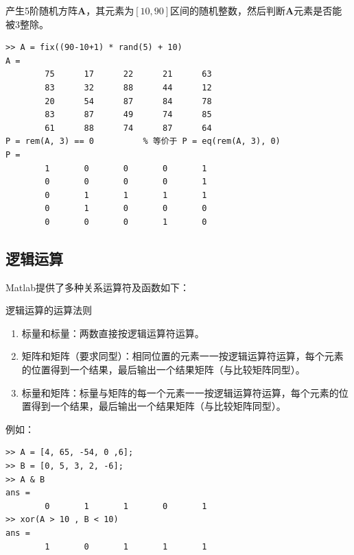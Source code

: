 \examples 产生5阶随机方阵$\bm{A}$，其元素为$[10,90]$区间的随机整数，然后判断$\bm{A}$元素是否能被3整除。
\begin{lstlisting}
>> A = fix((90-10+1) * rand(5) + 10)
A = 
		75		17		22		21		63
		83		32		88		44		12
		20		54		87		84		78
		83		87		49		74		85
		61		88		74		87		64
P = rem(A, 3) == 0			% 等价于 P = eq(rem(A, 3), 0)
P =
		1		0		0		0		1
		0		0		0		0		1
		0		1		1		1		1
		0		1		0		0		0
		0		0		0		1		0
\end{lstlisting}

\subsection{逻辑运算}
Matlab提供了多种关系运算符及函数如下：
\begin{table}[!htb]
	\centering
\end{table}

逻辑运算的运算法则
\begin{enumerate}[\hspace*{3em}$\bullet$]
	\item 标量和标量：两数直接按逻辑运算符运算。
	\item 矩阵和矩阵（要求同型）：相同位置的元素一一按逻辑运算符运算，每个元素的位置得到一个结果，最后输出一个结果矩阵（与比较矩阵同型）。
	\item 标量和矩阵：标量与矩阵的每一个元素一一按逻辑运算符运算，每个元素的位置得到一个结果，最后输出一个结果矩阵（与比较矩阵同型）。
\end{enumerate}
例如：
\begin{lstlisting}
>> A = [4, 65, -54, 0 ,6];
>> B = [0, 5, 3, 2, -6];
>> A & B
ans = 
		0		1		1		0		1
>> xor(A > 10 , B < 10)
ans = 
		1		0		1		1		1
\end{lstlisting}

